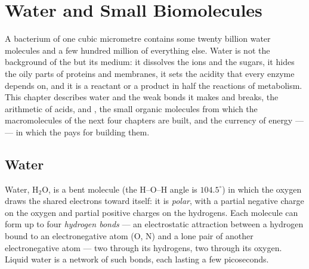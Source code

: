 \chapter{Water and Small Biomolecules}\label{ch:b1:water-small-molecules}

A bacterium of one cubic micrometre contains some twenty billion water
molecules and a few hundred million of everything else. Water is not
the background of the  but its medium: it dissolves the ions and the
sugars, it hides the oily parts of proteins and membranes, it sets the
acidity that every enzyme depends on, and it is a reactant or a product
in half the reactions of metabolism. This chapter describes water and
the weak bonds it makes and breaks, the arithmetic of acids,  and
, the small organic molecules from which the macromolecules of
the next four chapters are built, and the currency of energy ---  ---
in which the  pays for building them.

\section{Water}

\begin{definition}\label{def:b1:water-small-molecules:water}
Water, $\mathrm{H_2O}$, is a bent molecule (the H--O--H angle is
$104.5^\circ$) in which the oxygen draws the shared electrons toward
itself: it is \emph{polar}, with a partial
negative charge on the oxygen and partial positive charges on the
hydrogens. Each molecule can form up to four \emph{hydrogen
bonds} --- an electrostatic attraction between a
hydrogen bound to an electronegative atom (O, N) and a lone pair of
another electronegative atom --- two through its hydrogens, two through
its oxygen. Liquid water is a network of such bonds, each lasting a few
picoseconds.
\end{definition}

